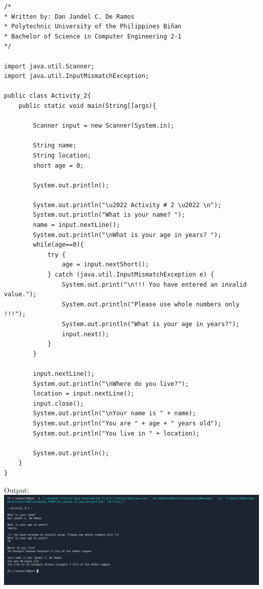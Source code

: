 \documentclass[12pt]{article}
\begin{document}
	\begin{verbatim}         
/*
* Written by: Dan Jandel C. De Ramos
* Polytechnic University of the Philippines Biñan
* Bachelor of Science in Computer Engineering 2-1
*/
	
import java.util.Scanner;
import java.util.InputMismatchException;
		
public class Activity_2{
	public static void main(String[]args){
				
		Scanner input = new Scanner(System.in);
				
		String name;
		String location;
		short age = 0;
		
		System.out.println();
		
		System.out.println("\u2022 Activity # 2 \u2022 \n");
		System.out.println("What is your name? ");
		name = input.nextLine();
		System.out.println("\nWhat is your age in years? ");        
		while(age==0){            
			try {
				age = input.nextShort();
			} catch (java.util.InputMismatchException e) {            
				System.out.print("\n!!! You have entered an invalid value.");
				System.out.println("Please use whole numbers only !!!");  
				System.out.println("What is your age in years?");
				input.next();          
			}
		}
				
		input.nextLine();
		System.out.println("\nWhere do you live?");
		location = input.nextLine();
		input.close();
		System.out.println("\nYour name is " + name);
		System.out.println("You are " + age + " years old");
		System.out.println("You live in " + location);
		
		System.out.println();
	}
}
	\end{verbatim}
	\clearpage
	\noindent
	Output:\\
	\includegraphics[width=\textwidth]{output2}
\end{document}
